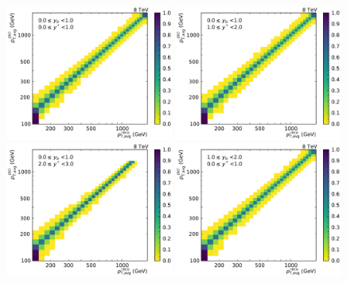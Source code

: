 \begin{figure}[htp]
    \centering
    \includegraphics[width=0.49\textwidth]{figures/measurement/res_matrix_ptavg_normalized_yb0ys0.pdf}\hfill
    \includegraphics[width=0.49\textwidth]{figures/measurement/res_matrix_ptavg_normalized_yb0ys1.pdf}
    \includegraphics[width=0.49\textwidth]{figures/measurement/res_matrix_ptavg_normalized_yb0ys2.pdf}\hfill
    \includegraphics[width=0.49\textwidth]{figures/measurement/res_matrix_ptavg_normalized_yb1ys0.pdf}

\end{figure}

